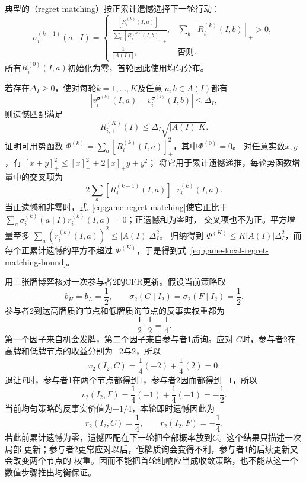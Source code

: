 典型的（regret matching）按正累计遗憾选择下一轮行动：
\begin{equation}
  \sigma_i^{(k+1)}(a\mid I)
  =
  \begin{cases}
    \displaystyle
    \frac{[R_i^{(k)}(I,a)]_+}
         {\sum_b[R_i^{(k)}(I,b)]_+},
      &\sum_b[R_i^{(k)}(I,b)]_+>0,\\[8pt]
    \displaystyle\frac{1}{|A(I)|},
      &\text{否则}.
  \end{cases}
  \label{eq:game-regret-matching}
\end{equation}
所有\(R_i^{(0)}(I,a)\)初始化为零，首轮因此使用均匀分布。

若存在\(\Delta_I\geq0\)，使对每轮\(k=1,\ldots,K\)及任意
\(a,b\in A(I)\)都有
\[
  \left|
    v_i^{\bm{\sigma}^{(k)}}(I,a)
    -
    v_i^{\bm{\sigma}^{(k)}}(I,b)
  \right|
  \leq\Delta_I,
\]
则遗憾匹配满足
\begin{equation}
  R_{i,+}^{(K)}(I)
  \leq
  \Delta_I\sqrt{|A(I)|K}.
  \label{eq:game-local-regret-matching-bound}
\end{equation}
证明可用势函数
\(\Phi^{(k)}=\sum_a[R_i^{(k)}(I,a)]_+^2\)，其中\(\Phi^{(0)}=0\)。
对任意实数\(x,y\)，有
\([x+y]_+^2\leq[x]_+^2+2[x]_+y+y^2\)；
将它用于累计遗憾递推，每轮势函数增量中的交叉项为
\[
  2\sum_a[R_i^{(k-1)}(I,a)]_+r_i^{(k)}(I,a).
\]
当正遗憾和非零时，式~\eqref{eq:game-regret-matching}使它正比于
\(\sum_a\sigma_i^{(k)}(a\mid I)r_i^{(k)}(I,a)=0\)；正遗憾和为零时，
交叉项也不为正。平方增量至多
\(\sum_a(r_i^{(k)}(I,a))^2\leq |A(I)|\Delta_I^2\)。
归纳得到
\(\Phi^{(K)}\leq K|A(I)|\Delta_I^2\)，而每个正累计遗憾的平方不超过
\(\Phi^{(K)}\)，于是得到式~\eqref{eq:game-local-regret-matching-bound}。

用三张牌博弈核对一次参与者2的CFR更新。假设当前策略取
\[
  b_H=b_L=\frac12,\qquad
  \sigma_2(C\mid I_2)=\sigma_2(F\mid I_2)=\frac12.
\]
参与者2到达高牌质询节点和低牌质询节点的反事实权重都为
\[
  \frac12\cdot\frac12=\frac14.
\]
第一个因子来自机会发牌，第二个因子来自参与者1质询。应对
\(C\)时，参与者2在高牌和低牌节点的收益分别为\(-2\)与\(2\)，所以
\[
  v_2(I_2,C)
  =
  \frac14(-2)+\frac14(2)=0.
\]
退让\(F\)时，参与者1在两个节点都得到\(1\)，参与者2因而都得到\(-1\)，所以
\[
  v_2(I_2,F)
  =
  \frac14(-1)+\frac14(-1)=-\frac12.
\]
当前均匀策略的反事实价值为\(-1/4\)，本轮即时遗憾因此为
\[
  r_2(I_2,C)=\frac14,\qquad
  r_2(I_2,F)=-\frac14.
\]
若此前累计遗憾为零，遗憾匹配在下一轮把全部概率放到\(C\)。这个结果只描述一次局部
更新；参与者2更常应对以后，低牌质询会变得不利，参与者1的后续更新又会改变两个节点的
权重。因而不能把首轮纯响应当成收敛策略，也不能从这一个数值步骤推出均衡保证。

